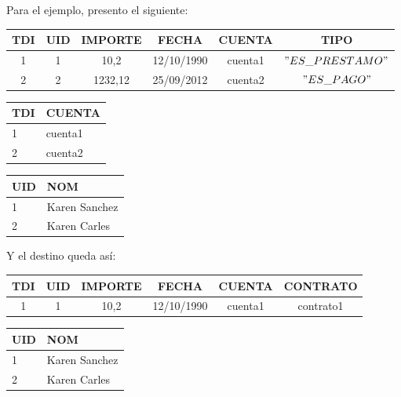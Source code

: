 Para el ejemplo, presento el siguiente: \\

\begin{table}[h]
	\begin{tabular}{c|c|c|c|c|c}
		TDI  & UID & IMPORTE & FECHA & CUENTA & TIPO \\ \hline
		1 & 1 & 10,2 & 12/10/1990 &  cuenta1 & $"ES\_PRESTAMO"$ \\
		2 & 2 & 1232,12 & 25/09/2012 & cuenta2 & $"ES\_PAGO"$ \\
	\end{tabular}
\end{table}

\begin{table}[h]
	\begin{tabular}{l|l}
		TDI  & CUENTA \\ \hline
		1 & cuenta1 \\
		2 & cuenta2 \\
	\end{tabular}
\end{table}

\begin{table}[h]
	\begin{tabular}{l|l}
		UID & NOM\\ \hline
		 1 & Karen Sanchez \\
		 2 & Karen Carles  \\
	\end{tabular}
\end{table}

Y el destino queda así: \\

\begin{table}[h]
	\begin{tabular}{c|c|c|c|c|c}
		TDI  & UID & IMPORTE & FECHA & CUENTA & CONTRATO\\ \hline
		1 & 1 & 10,2 & 12/10/1990 &  cuenta1 & contrato1 \\
	\end{tabular}
\end{table}

\begin{table}[h]
	\begin{tabular}{l|l}
		UID  & NOM\\ \hline
		1 & Karen Sanchez \\
		2 & Karen Carles  \\
	\end{tabular}
\end{table}


\bigskip
